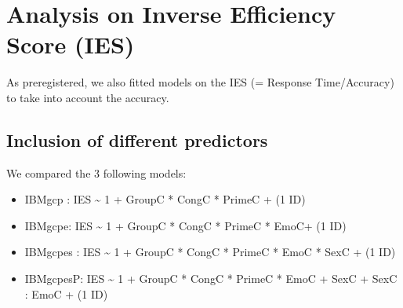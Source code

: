 \documentclass[
  11pt,
  english,
  ,doc,floatsintext]{apa6}
\begin{document}
\newpage

\hypertarget{analysis-on-inverse-efficiency-score-ies}{%
\section{Analysis on Inverse Efficiency Score (IES)}\label{analysis-on-inverse-efficiency-score-ies}}

As preregistered, we also fitted models on the IES (= Response Time/Accuracy) to take into account the accuracy.

\hypertarget{inclusion-of-different-predictors-1}{%
\subsection{Inclusion of different predictors}\label{inclusion-of-different-predictors-1}}

We compared the 3 following models:

\begin{itemize}
\item
  IBMgcp : IES \textasciitilde{} 1 + GroupC * CongC * PrimeC + (1 \textbar{} ID)
\item
  IBMgcpe: IES \textasciitilde{} 1 + GroupC * CongC * PrimeC * EmoC+ (1 \textbar{} ID)
\item
  IBMgcpes : IES \textasciitilde{} 1 + GroupC * CongC * PrimeC * EmoC * SexC + (1 \textbar{} ID)
\item
  IBMgcpesP: IES \textasciitilde{} 1 + GroupC * CongC * PrimeC * EmoC + SexC + SexC : EmoC + (1 \textbar{} ID)
\end{itemize}
\end{document}
